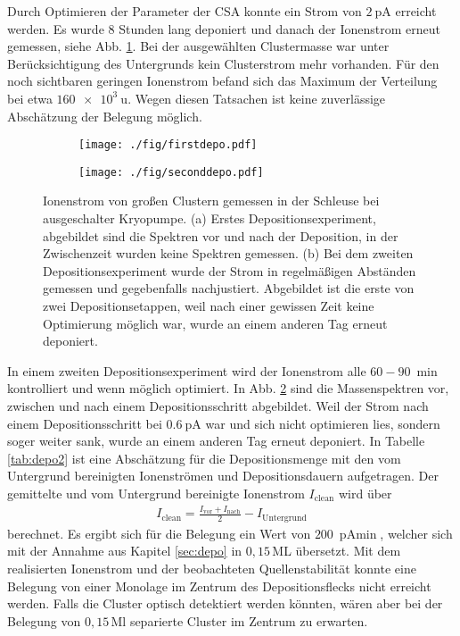 Durch Optimieren der Parameter der CSA konnte ein Strom von $\SI{2}{\pA}$ erreicht werden.
Es wurde 8 Stunden lang deponiert und danach der Ionenstrom erneut gemessen, siehe Abb. \ref{fig:firstdepo}.
Bei der ausgewählten Clustermasse war unter Berücksichtigung des Untergrunds kein Clusterstrom mehr vorhanden. 
Für den noch sichtbaren geringen Ionenstrom befand sich das Maximum der Verteilung bei etwa $\SI{160e3}{\amu}$.
Wegen diesen Tatsachen ist keine zuverlässige Abschätzung der Belegung möglich.\\
\begin{figure}[h]
  \begin{subfigure}[h]{\textwidth}
    \texttt{[image: ./fig/firstdepo.pdf]}
    \caption{}
    \label{fig:firstdepo}
  \end{subfigure}\hfill
  \begin{subfigure}[t]{\textwidth}
    \texttt{[image: ./fig/seconddepo.pdf]}
    \caption{}
    \label{fig:seconddepo}
  \end{subfigure}
  \caption{Ionenstrom von großen Clustern gemessen in der Schleuse bei ausgeschalter Kryopumpe. (a) Erstes Depositionsexperiment, abgebildet sind die Spektren vor und nach der Deposition, in der Zwischenzeit wurden keine Spektren gemessen. (b) Bei dem zweiten Depositionsexperiment wurde der Strom in regelmäßigen Abständen gemessen und gegebenfalls nachjustiert. Abgebildet ist die erste von zwei Depositionsetappen, weil nach einer gewissen Zeit keine Optimierung möglich war, wurde an einem anderen Tag erneut deponiert.} 
  \label{fig:deposition}
\end{figure}

In einem zweiten Depositionsexperiment wird der Ionenstrom alle $60 - \SI{90}{\min}$ kontrolliert und wenn möglich optimiert.
In Abb. \ref{fig:seconddepo} sind die Massenspektren vor, zwischen und nach einem Depositionsschritt abgebildet. 
Weil der Strom nach einem Depositionsschritt bei $\SI{0.6}{\pA}$ war und sich nicht optimieren lies, sondern soger weiter sank, wurde an einem anderen Tag erneut deponiert.
In Tabelle \ref{tab:depo2} ist eine Abschätzung für die Depositionsmenge mit den vom Untergrund bereinigten Ionenströmen und Depositionsdauern aufgetragen. Der gemittelte und vom Untergrund bereinigte Ionenstrom $I_{\text{clean}}$ wird über
\begin{align*}
  I_{\text{clean}}=\frac{I_{\text{vor}}+I_{\text{nach}}}{2}-I_{\text{Untergrund}}
\end{align*} 
berechnet. 
Es ergibt sich für die Belegung ein Wert von $\SI{200}{\pA\min}$, welcher sich mit der Annahme aus Kapitel \ref{sec:depo} in $0,15\,$ML übersetzt.
Mit dem realisierten Ionenstrom und der beobachteten Quellenstabilität konnte eine Belegung von einer Monolage im Zentrum des Depositionsflecks nicht erreicht werden.
Falls die Cluster optisch detektiert werden könnten, wären aber bei der Belegung von $0,15\,$Ml separierte Cluster im Zentrum zu erwarten.

